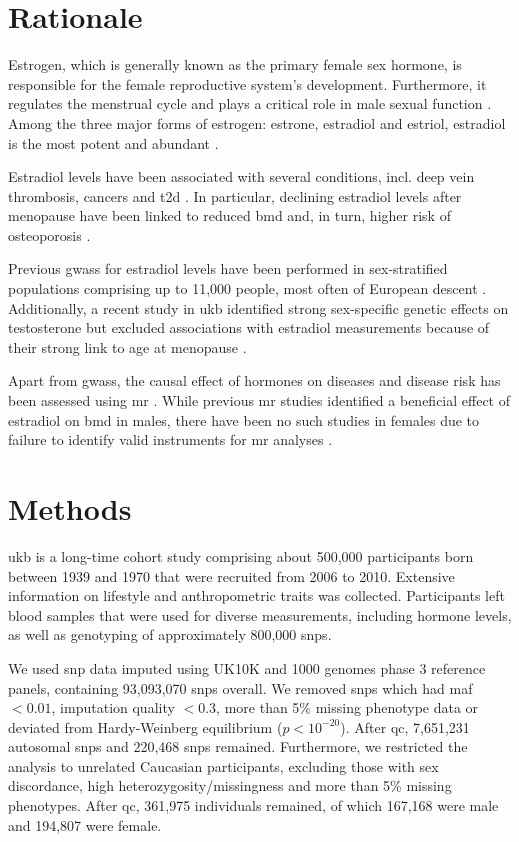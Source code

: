 \documentclass[]{scrbook}
\begin{document}
\section{Rationale}
Estrogen, which is generally known as the primary female sex hormone, is responsible for the female reproductive system's development.
Furthermore, it regulates the menstrual cycle and plays a critical role in male sexual function \cite{Bates2013b,Hess1997b}. 
Among the three major forms of estrogen: estrone, estradiol and estriol, estradiol is the most potent and abundant \cite{Thomas2013c}.

Estradiol levels have been associated with several conditions, incl. deep vein thrombosis, cancers and \gls{t2d} \cite{Cauley1999a, Rosendaal2003b,Vikan2010}.
In particular, declining estradiol levels after menopause have been linked to reduced \gls{bmd} and, in turn, higher risk of osteoporosis \cite{Riggs1998a,Longo2012a}.

Previous \glspl{gwas} for estradiol levels have been performed in sex-stratified populations comprising up to 11,000 people, most often of European descent \cite{Pott2019e,Chen2013d,Liu2013b,Prescott2012f,Eriksson2018b}.
Additionally, a recent study in \gls{ukb} identified strong sex-specific genetic effects on testosterone but excluded associations with estradiol measurements because of their strong link to age at menopause \cite{Ruth2020d}.

Apart from \glspl{gwas}, the causal effect of hormones on diseases and disease risk has been assessed using \gls{mr} \cite{Eriksson2018b,Ruth2020d, Nethander2018a}.
While previous \gls{mr} studies identified a beneficial effect of estradiol on \gls{bmd} in males, there have been no such studies in females due to failure to identify valid instruments for \gls{mr} analyses \cite{Eriksson2018b, Nethander2018a}.

\section{Methods}
\Gls{ukb} is a long-time cohort study comprising about 500,000 participants born between 1939 and 1970 that were recruited from 2006 to 2010.
Extensive information on lifestyle and anthropometric traits was collected.
Participants left blood samples that were used for diverse measurements, including hormone levels, as well as genotyping of approximately 800,000 \glspl{snp}.

We used \gls{snp} data imputed using UK10K and 1000 genomes phase 3 reference panels, containing 93,093,070 \glspl{snp} overall.
We removed \glspl{snp} which had \gls{maf} $ < 0.01$, imputation quality $ < 0.3 $, more than 5\% missing phenotype data or deviated from Hardy-Weinberg equilibrium ($p < 10^{-20}$).
After \gls{qc}, 7,651,231 autosomal \glspl{snp} and 220,468 \glspl{snp} remained. Furthermore, we restricted the analysis to unrelated Caucasian participants, excluding those with sex discordance, high heterozygosity/missingness and more than 5\% missing phenotypes. After \gls{qc}, 361,975 individuals remained, of which 167,168 were male and 194,807 were female.
\end{document}
